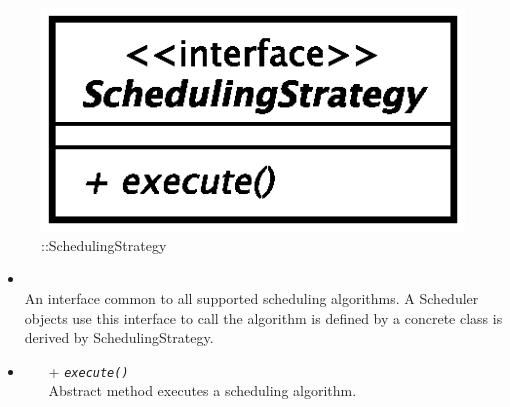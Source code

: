 \begin{figure}[h]
\centering
\includegraphics[scale=0.6,keepaspectratio]{images/solution/scheduling_strategy.eps}
\caption{\pScheduling::SchedulingStrategy}
\label{fig:sd-app-scheduling-scheduling-strategy}
\end{figure}
\FloatBarrier
\begin{itemize}
  \item \textbf{\descr} \\
    An interface common to all supported scheduling algorithms. 
    A Scheduler objects use this interface to call the algorithm 
    is defined by a concrete class is derived by SchedulingStrategy.
  \item \textbf{\ops}
  \begin{itemize}
    \item[+] \texttt{\textit{execute()}} \\
Abstract method executes a scheduling algorithm.
  \end{itemize}
\end{itemize}
